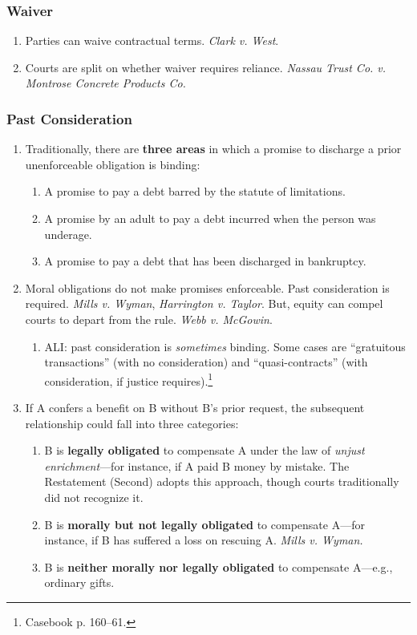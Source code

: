 \subsubsection{Waiver}

\begin{enumerate}
    \item Parties can waive contractual terms. \emph{Clark v. West}.
    \item Courts are split on whether waiver requires reliance. \emph{Nassau 
    Trust Co. v. Montrose Concrete Products Co.}
\end{enumerate}

\subsubsection{Past Consideration}

\begin{enumerate}
    \item Traditionally, there are \textbf{three areas} in which a promise to 
    discharge a prior unenforceable obligation is binding:
    \begin{enumerate}
        \item A promise to pay a debt barred by the statute of limitations.
        \item A promise by an adult to pay a debt incurred when the person was 
        underage.
        \item A promise to pay a debt that has been discharged in bankruptcy.
    \end{enumerate}
    \item Moral obligations do not make promises enforceable. Past 
    consideration is required. \emph{Mills v. Wyman}, \emph{Harrington v. 
    Taylor}. But, equity can compel courts to depart from the rule. 
    \emph{Webb v. McGowin}.
    \begin{enumerate}
        \item ALI: past consideration is \emph{sometimes} binding. Some cases 
        are ``gratuitous transactions'' (with no consideration) and 
        ``quasi-contracts'' (with consideration, if justice 
        requires).\footnote{Casebook p. 160--61.}
    \end{enumerate}
    \item If A confers a benefit on B without B's prior request, the 
    subsequent relationship could fall into three categories:
    \begin{enumerate}
        \item B is \textbf{legally obligated} to compensate A under the law of 
        \emph{unjust enrichment}---for instance, if A paid B money by mistake. 
        The Restatement (Second) adopts this approach, though courts 
        traditionally did not recognize it.
        \item B is \textbf{morally but not legally obligated} to compensate 
        A---for instance, if B has suffered a loss on rescuing A. \emph{Mills 
        v. Wyman.}
        \item B is \textbf{neither morally nor legally obligated} to 
        compensate A---e.g., ordinary gifts.
    \end{enumerate}
\end{enumerate}

